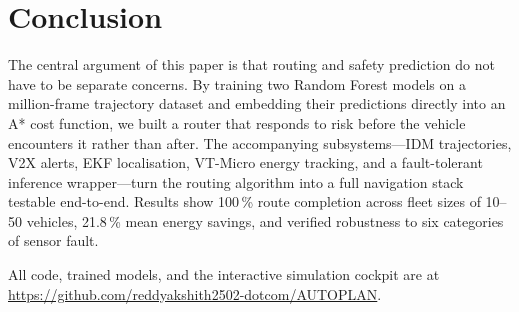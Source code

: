 \documentclass[conference]{IEEEtran}
\begin{document}
\section{Conclusion}
\label{sec:conclusion}

The central argument of this paper is that routing and safety prediction do
not have to be separate concerns. By training two Random Forest models on a
million-frame trajectory dataset and embedding their predictions directly into
an A* cost function, we built a router that responds to risk before the
vehicle encounters it rather than after. The accompanying subsystems---IDM
trajectories, V2X alerts, EKF localisation, VT-Micro energy tracking, and a
fault-tolerant inference wrapper---turn the routing algorithm into a
full navigation stack testable end-to-end. Results show 100\,\% route
completion across fleet sizes of 10--50 vehicles, 21.8\,\% mean energy
savings, and verified robustness to six categories of sensor fault.

All code, trained models, and the interactive simulation cockpit are at
\url{https://github.com/reddyakshith2502-dotcom/AUTOPLAN}.
\end{document}
